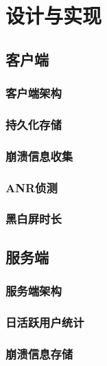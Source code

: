 
\chapter{设计与实现}
\label{chap:design}


\section{客户端}

\subsection{客户端架构}

\subsection{持久化存储}

\subsection{崩溃信息收集}

\subsection{ANR侦测}

\subsection{黑白屏时长}



\section{服务端}

\subsection{服务端架构}

\subsection{日活跃用户统计}

\subsection{崩溃信息存储}


